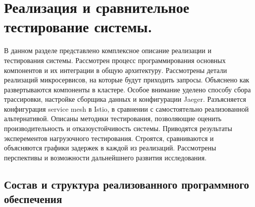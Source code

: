 \chapter{Реализация и сравнительное тестирование системы.}

В данном разделе представлено комплексное описание реализации и тестирования системы. Рассмотрен процесс программирования основных компонентов и их интеграции в общую архитектуру. Рассмотрены детали реализаций микросервисов, на которые будут приходить запросы. Объяснено как развертываются компоненты в кластере. Особое внимание уделено способу сбора трассировки, настройке сборщика данных и конфигурации Jaeger. Разъясняется конфигурация service mesh в Istio, в сравнении с самостоятельно реализованной альтернативой. Описаны методики тестирования, позволяющие оценить производительность и отказоустойчивость системы. Приводятся результаты эксперементов нагрузочного тестирования. Строятся, сравниваются и объясняются графики задержек в каждой из реализаций.  Рассмотрены перспективы и возможности дальнейшнего развития исследования.



\section{Состав и структура реализованного программного обеспечения}




